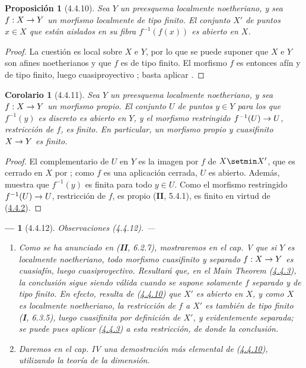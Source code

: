 \documentclass[10pt,oneside,openany]{book}
\theoremstyle{egaenv}\newtheorem*{env}{---}
\theoremstyle{egastatement}
\newtheorem*{proposition}{Proposición}
\newtheorem*{corollary}{Corolario}
\theoremstyle{egadescription}
\newcommand{\oldpage}[2][]{\marginnote{\normalfont\scriptsize\textbf{#1}\,|\,#2}\ignorespaces}
\renewcommand{\to}{\mathchoice{\longrightarrow}{\rightarrow}{\rightarrow}{\rightarrow}}
\begin{document}
\begin{proposition}[4.4.10]
\label{III.4.4.10}
\label{III.4.4.10-fr}
Sea $Y$ un preesquema localmente noetheriano, y sea $f:X\to Y$ un
morfismo localmente de tipo finito. El conjunto $X'$ de puntos
$x\in X$ que están aislados en su fibra $f^{-1}(f(x))$ es abierto en
$X$.
\end{proposition}

\begin{proof}
La cuestión es local sobre $X$ e $Y$, por lo que se puede suponer que
$X$ e $Y$ son afines noetherianos y que $f$ es de tipo finito. El
morfismo $f$ es entonces afín y de tipo finito, luego
cuasiproyectivo ; basta aplicar
.
\end{proof}

\oldpage[III]{138}

\begin{corollary}[4.4.11]
\label{III.4.4.11}
\label{III.4.4.11-fr}
Sea $Y$ un preesquema localmente noetheriano, y sea $f:X\to Y$ un
morfismo propio. El conjunto $U$ de puntos $y\in Y$ para los que
$f^{-1}(y)$ es discreto es abierto en $Y$, y el morfismo restringido
$f^{-1}(U)\to U$, restricción de $f$, es
finito. En particular, un morfismo propio y cuasifinito $X\to Y$ es finito.
\end{corollary}

\begin{proof}
El complementario de $U$ en $Y$ es la imagen por $f$ de $X\setmin X'$, que
es cerrado en $X$ por ; como $f$ es una aplicación
cerrada, $U$ es abierto. Además,  muestra que
$f^{-1}(y)$ es finita para todo $y\in U$. Como el morfismo restringido
$f^{-1}(U)\to U$, restricción de $f$, es propio (\textbf{II}, 5.4.1), es finito en
virtud de (\hyperref[III.4.4.2-fr]{4.4.2}).
\end{proof}

\begin{env}[4.4.12]
\label{III.4.4.12-fr}
\emph{Observaciones} (4.4.12). ---
\begin{enumerate}
\item[(i)] Como se ha anunciado en (\textbf{II}, 6.2.7), mostraremos en el cap. V
que si $Y$ es localmente noetheriano, todo morfismo cuasifinito y separado
$f:X\to Y$ es cuasiafín, luego cuasiproyectivo. Resultará que, en el
Main Theorem (\hyperref[III.4.4.3-fr]{4.4.3}), la conclusión sigue siendo válida
cuando se supone solamente $f$ \emph{separado y de tipo finito}. En efecto, resulta
de (\hyperref[III.4.4.10-fr]{4.4.10}) que $X'$ es abierto en $X$, y como
$X$ es localmente noetheriano, la restricción de $f$ a $X'$ es también de
tipo finito (\textbf{I}, 6.3.5), luego cuasifinita por definición de $X'$, y evidentemente
separada; se puede pues aplicar (\hyperref[III.4.4.3-fr]{4.4.3}) a esta
restricción, de donde la conclusión.

\item[(ii)] Daremos en el cap. IV una demostración más elemental de
(\hyperref[III.4.4.10-fr]{4.4.10}), utilizando la teoría de la dimensión.
\end{enumerate}
\end{env}
\end{document}
